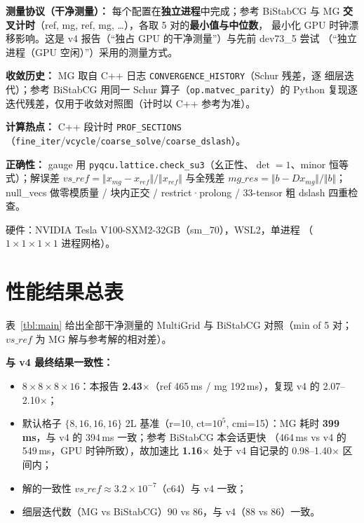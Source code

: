 \documentclass[11pt,a4paper]{article}
\begin{document}
\textbf{测量协议（干净测量）：} 每个配置在\textbf{独立进程}中完成；参考 BiStabCG 与
MG \textbf{交叉计时}（ref, mg, ref, mg, \dots），各取 5 对的\textbf{最小值与中位数}，
最小化 GPU 时钟漂移影响。这是 v4 报告（``独占 GPU 的干净测量''）与先前 dev73\_5 尝试
（``独立进程（GPU 空闲）''）采用的测量方式。

\textbf{收敛历史：} MG 取自 C++ 日志 \texttt{CONVERGENCE\_HISTORY}（Schur 残差，逐
细层迭代）；参考 BiStabCG 用同一 Schur 算子（\texttt{op.matvec\_parity}）的 Python
复现逐迭代残差，仅用于收敛对照图（计时以 C++ 参考为准）。

\textbf{计算热点：} C++ 段计时 \texttt{PROF\_SECTIONS}
（\texttt{fine\_iter}/\texttt{vcycle}/\texttt{coarse\_solve}/\texttt{coarse\_dslash}）。

\textbf{正确性：} gauge 用 \texttt{pyqcu.lattice.check\_su3}（幺正性、$\det=1$、minor
恒等式）；解误差 $vs\_ref=\Vert x_{mg}-x_{ref}\Vert/\Vert x_{ref}\Vert$ 与全残差
$mg\_res=\Vert b-D x_{mg}\Vert/\Vert b\Vert$；null\_vecs 做零模质量 / 块内正交 /
restrict·prolong / 33-tensor 粗 dslash 四重检查。

硬件：NVIDIA Tesla V100-SXM2-32GB（sm\_70），WSL2，单进程
（$1\times1\times1\times1$ 进程网格）。

\section{性能结果总表}
\label{sec:perf}

表~\ref{tbl:main} 给出全部干净测量的 MultiGrid 与 BiStabCG 对照（min of 5 对；
$vs\_ref$ 为 MG 解与参考解的相对差）。


\label{tbl:main}

\textbf{与 v4 最终结果一致性：}
\begin{itemize}
  \item $8\times8\times8\times16$：本报告 \textbf{2.43$\times$}（ref 465\,ms /
        mg 192\,ms），复现 v4 的 2.07--2.10$\times$；
  \item 默认格子 $\{8,16,16,16\}$ 2L 基准（r=10, ct=$10^5$, cmi=15）：MG 耗时
        \textbf{399\,ms}，与 v4 的 394\,ms 一致；参考 BiStabCG 本会话更快
        （464\,ms vs v4 的 549\,ms，GPU 时钟所致），故加速比 \textbf{1.16$\times$}
        处于 v4 自记录的 0.98--1.40$\times$ 区间内；
  \item 解的一致性 $vs\_ref\approx3.2\times10^{-7}$（c64）与 v4 一致；
  \item 细层迭代数（MG vs BiStabCG）$90$ vs $86$，与 v4（88 vs 86）一致。
\end{itemize}
\end{document}

